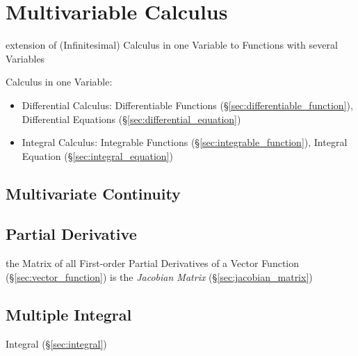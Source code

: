 \section{Multivariable Calculus}\label{sec:multivariable_calculus}

extension of (Infinitesimal) Calculus in one Variable to Functions with several
Variables

Calculus in one Variable:
\begin{itemize}
\item Differential Calculus: Differentiable Functions
  (\S\ref{sec:differentiable_function}), Differential Equations
  (\S\ref{sec:differential_equation})
\item Integral Calculus: Integrable Functions
  (\S\ref{sec:integrable_function}), Integral Equation
  (\S\ref{sec:integral_equation})
\end{itemize}



\subsection{Multivariate Continuity}\label{sec:multivariate_continuity}

\subsection{Partial Derivative}\label{sec:partial_derivative}

the Matrix of all First-order Partial Derivatives of a Vector Function
(\S\ref{sec:vector_function}) is the \emph{Jacobian Matrix}
(\S\ref{sec:jacobian_matrix})



\subsection{Multiple Integral}\label{sec:multiple_integral}

Integral (\S\ref{sec:integral})

